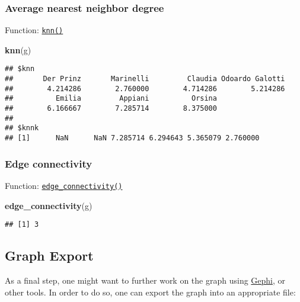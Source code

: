 \documentclass[]{book}
\newenvironment{Shaded}{\begin{snugshade}}{\end{snugshade}}
\newcommand{\KeywordTok}[1]{\textcolor[rgb]{0.13,0.29,0.53}{\textbf{#1}}}
\newcommand{\NormalTok}[1]{#1}
\begin{document}
\hypertarget{average-nearest-neighbor-degree}{%
\subsubsection{Average nearest neighbor degree}\label{average-nearest-neighbor-degree}}

Function: \href{https://igraph.org/r/doc/knn.html}{\texttt{knn()}}

\begin{Shaded}
\begin{Highlighting}[]
\KeywordTok{knn}\NormalTok{(g)}
\end{Highlighting}
\end{Shaded}

\begin{verbatim}
## $knn
##       Der Prinz       Marinelli         Claudia Odoardo Galotti 
##        4.214286        2.760000        4.714286        5.214286 
##          Emilia         Appiani          Orsina 
##        6.166667        7.285714        8.375000 
## 
## $knnk
## [1]      NaN      NaN 7.285714 6.294643 5.365079 2.760000
\end{verbatim}

\hypertarget{edge-connectivity}{%
\subsubsection{Edge connectivity}\label{edge-connectivity}}

Function: \href{https://igraph.org/r/doc/edge_connectivity.html}{\texttt{edge\_connectivity()}}

\begin{Shaded}
\begin{Highlighting}[]
\KeywordTok{edge_connectivity}\NormalTok{(g)}
\end{Highlighting}
\end{Shaded}

\begin{verbatim}
## [1] 3
\end{verbatim}

\hypertarget{graph-export}{%
\subsection{Graph Export}\label{graph-export}}

As a final step, one might want to further work on the graph using \href{https://gephi.org}{Gephi}, or other tools. In order to do so, one can export the graph into an appropriate file:
\end{document}
